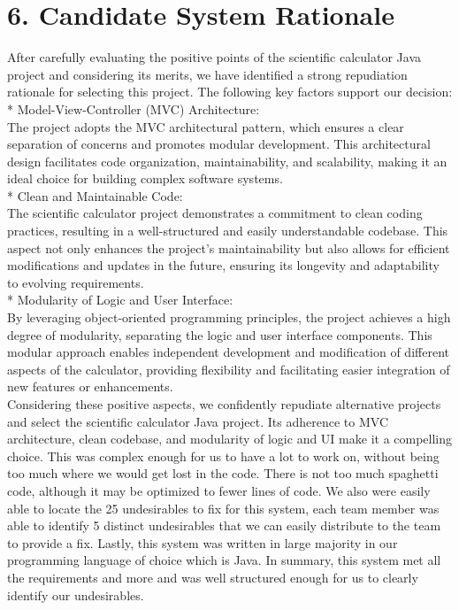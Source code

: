 \documentclass[letterpaper, 11pt]{report}
\begin{document}
\section*{6. Candidate System Rationale}
\normalsize{
After carefully evaluating the positive points of the scientific calculator Java project and considering its merits, we have identified a strong repudiation rationale for selecting this project. The following key factors support our decision:
\\

* Model-View-Controller (MVC) Architecture:  \\The project adopts the MVC architectural pattern, which ensures a clear separation of concerns and promotes modular development. This architectural design facilitates code organization, maintainability, and scalability, making it an ideal choice for building complex software systems.\\

* Clean and Maintainable Code: \\The scientific calculator project demonstrates a commitment to clean coding practices, resulting in a well-structured and easily understandable codebase. This aspect not only enhances the project's maintainability but also allows for efficient modifications and updates in the future, ensuring its longevity and adaptability to evolving requirements.\\

* Modularity of Logic and User Interface:  \\By leveraging object-oriented programming principles, the project achieves a high degree of modularity, separating the logic and user interface components. This modular approach enables independent development and modification of different aspects of the calculator, providing flexibility and facilitating easier integration of new features or enhancements.\\


Considering these positive aspects, we confidently repudiate alternative projects and select the scientific calculator Java project. Its adherence to MVC architecture, clean codebase, and modularity of logic and UI make it a compelling choice.  This was complex enough for us to have a lot to work on, without being too much where we would get lost in the code. There is not too much spaghetti code, although it may be optimized to fewer lines of code. We also were easily able to locate the 25 undesirables to fix for this system, each team member was able to identify 5 distinct undesirables that we can easily distribute to the team to provide a fix. Lastly, this system was written in large majority in our programming language of choice which is Java. In summary, this system met all the requirements and more and was well structured enough for us to clearly identify our undesirables.
}\\
\end{document}
